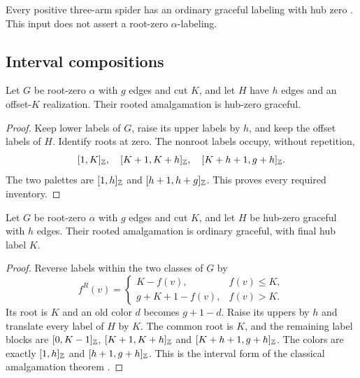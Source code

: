 \begin{theorem}\label{common:hubzero-three}
\label{app:hubzero-three}
Every positive three-arm spider has an ordinary graceful labeling
with hub zero \cite[Theorem~3.2]{Panpa2025}. This input does not assert
a root-zero $\alpha$-labeling.
\end{theorem}

\subsection{Interval compositions}

\begin{lemma}\label{common:alpha-offset}
Let $G$ be root-zero $\alpha$ with $g$ edges and cut $K$, and let
$H$ have $h$ edges and an offset-$K$ realization. Their rooted
amalgamation is hub-zero graceful.
\end{lemma}
\begin{proof}
Keep lower labels of $G$, raise its upper labels by $h$, and keep
the offset labels of $H$. Identify roots at zero. The nonroot labels
occupy, without repetition,
\[
 [1,K]_{\mathbb Z},\quad[K+1,K+h]_{\mathbb Z},\quad
 [K+h+1,g+h]_{\mathbb Z}.
\]
The two palettes are $[1,h]_{\mathbb Z}$ and
$[h+1,h+g]_{\mathbb Z}$. This proves every required inventory.
\end{proof}

\begin{lemma}\label{common:ordinary-amalgamation}
Let $G$ be root-zero $\alpha$ with $g$ edges and cut $K$, and let
$H$ be hub-zero graceful with $h$ edges. Their rooted amalgamation is
ordinary graceful, with final hub label $K$.
\end{lemma}
\begin{proof}
Reverse labels within the two classes of $G$ by
\[
 f^R(v)=\begin{cases}K-f(v),&f(v)\le K,\\
 g+K+1-f(v),&f(v)>K.\end{cases}
\]
Its root is $K$ and an old color $d$ becomes $g+1-d$. Raise its
uppers by $h$ and translate every label of $H$ by $K$. The common
root is $K$, and the remaining label blocks are
$[0,K-1]_{\mathbb Z}$, $[K+1,K+h]_{\mathbb Z}$ and
$[K+h+1,g+h]_{\mathbb Z}$. The colors are exactly
$[1,h]_{\mathbb Z}$ and $[h+1,g+h]_{\mathbb Z}$.
This is the interval form of the classical amalgamation theorem
\cite{HuangKotzigRosa1982}.
\end{proof}

